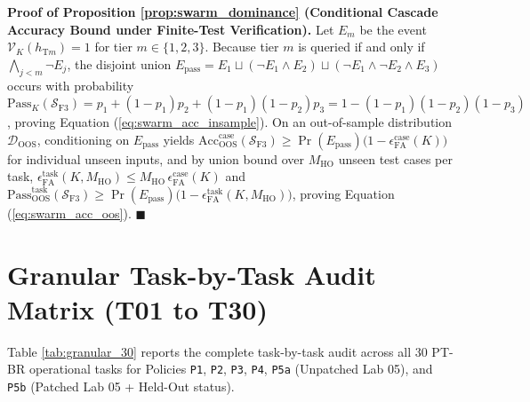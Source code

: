 \documentclass[10pt,a4paper]{article}
\begin{document}
\textbf{Proof of Proposition \ref{prop:swarm_dominance} (Conditional Cascade Accuracy Bound under Finite-Test Verification).}
Let $E_m$ be the event $\mathcal{V}_K(h_{\text{T}m}) = 1$ for tier $m \in \{1,2,3\}$. Because tier $m$ is queried if and only if $\bigwedge_{j < m} \neg E_j$, the disjoint union $E_{\text{pass}} = E_1 \sqcup (\neg E_1 \land E_2) \sqcup (\neg E_1 \land \neg E_2 \land E_3)$ occurs with probability $\text{Pass}_K(\mathcal{S}_{\text{F3}}) = p_1 + (1-p_1)p_2 + (1-p_1)(1-p_2)p_3 = 1 - (1-p_1)(1-p_2)(1-p_3)$, proving Equation (\ref{eq:swarm_acc_insample}). On an out-of-sample distribution $\mathcal{D}_{\text{OOS}}$, conditioning on $E_{\text{pass}}$ yields $\text{Acc}_{\text{OOS}}^{\text{case}}(\mathcal{S}_{\text{F3}}) \ge \Pr(E_{\text{pass}})\big(1 - \epsilon_{\text{FA}}^{\text{case}}(K)\big)$ for individual unseen inputs, and by union bound over $M_{\text{HO}}$ unseen test cases per task, $\epsilon_{\text{FA}}^{\text{task}}(K, M_{\text{HO}}) \le M_{\text{HO}}\,\epsilon_{\text{FA}}^{\text{case}}(K)$ and $\text{Pass}_{\text{OOS}}^{\text{task}}(\mathcal{S}_{\text{F3}}) \ge \Pr(E_{\text{pass}})\big(1 - \epsilon_{\text{FA}}^{\text{task}}(K, M_{\text{HO}})\big)$, proving Equation (\ref{eq:swarm_acc_oos}). $\blacksquare$

\section{Granular Task-by-Task Audit Matrix (T01 to T30)}
\label{app:granular}

Table \ref{tab:granular_30} reports the complete task-by-task audit across all $30$ PT-BR operational tasks for Policies \texttt{P1}, \texttt{P2}, \texttt{P3}, \texttt{P4}, \texttt{P5a} (Unpatched Lab 05), and \texttt{P5b} (Patched Lab 05 + Held-Out status).
\end{document}
